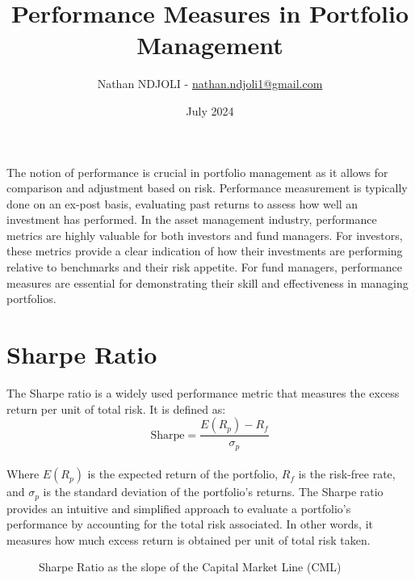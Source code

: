 \documentclass[a4paper,10pt]{article}
\title{Performance Measures in Portfolio Management}
\author{Nathan NDJOLI - \href{mailto:nathan.ndjoli1@gmail.com}{nathan.ndjoli1@gmail.com}}
\date{July 2024}
\begin{document}
\maketitle

\noindent The notion of performance is crucial in portfolio management as it allows for comparison and adjustment based on risk. Performance measurement is typically done on an ex-post basis, evaluating past returns to assess how well an investment has performed. In the asset management industry, performance metrics are highly valuable for both investors and fund managers. For investors, these metrics provide a clear indication of how their investments are performing relative to benchmarks and their risk appetite. For fund managers, performance measures are essential for demonstrating their skill and effectiveness in managing portfolios.

\section*{Sharpe Ratio}

\noindent The Sharpe ratio is a widely used performance metric that measures the excess return per unit of total risk. It is defined as: \\
\[ \text{Sharpe} = \frac{E(R_p) - R_f}{\sigma_p} \] \\
\noindent Where \( E(R_p) \) is the expected return of the portfolio, \( R_f \) is the risk-free rate, and \( \sigma_p \) is the standard deviation of the portfolio's returns. The Sharpe ratio provides an intuitive and simplified approach to evaluate a portfolio's performance by accounting for the total risk associated. In other words, it measures how much excess return is obtained per unit of total risk taken. \\

\begin{figure}[htbp!]
\centering
{}
\caption{Sharpe Ratio as the slope of the Capital Market Line (CML)}
\end{figure}
\end{document}
